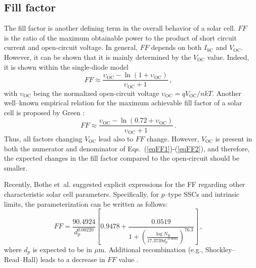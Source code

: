 \documentclass[a4paper,fleqn]{cas-sc}
\begin{document}
\subsection{Fill factor}
The fill factor is another defining term in the overall behavior of a solar cell.
$FF$ is the ratio of the maximum obtainable power to the product of short circuit current and open-circuit voltage.
In general, $FF$ depends on both $I_\mathrm{SC}$ and $V_\mathrm{OC}$. 
However, it can be shown that it is mainly determined by the $V_\mathrm{OC}$ value. 
Indeed, it is shown \cite{YangHandbookPVSi} within the single-diode model
\begin{equation}
\label{eqFF1}
    FF \approx \frac{\upsilon_\mathrm{OC}-\ln\left(1+\upsilon_\mathrm{OC}\right)}{\upsilon_\mathrm{OC}+1} \,,
\end{equation}
with $\upsilon_\mathrm{OC}$ being the normalized open-circuit voltage 
$\upsilon_\mathrm{OC}=qV_\mathrm{OC}/nkT$.
Another well--known empirical relation for the maximum achievable fill factor of a solar cell is proposed by Green \cite{Green1981,Green1982}:
\begin{equation}
\label{eqFF2}
    FF \approx \frac{\upsilon_\mathrm{OC}-\ln\left(0.72+\upsilon_\mathrm{OC}\right)}{\upsilon_\mathrm{OC}+1} \,.
\end{equation}
Thus, all factors changing $V_\mathrm{OC}$ lead also to $FF$ change.
However, $V_\mathrm{OC}$ is present in both the numerator and denominator of Eqs.~(\ref{eqFF1})-(\ref{eqFF2}), 
and therefore, the expected changes in the fill factor compared to the open-circuit should be smaller.

Recently, Bothe et~al. \cite{Bothe2023} suggested explicit expressions for the FF regarding other characteristic solar cell parameters.
Specifically, for $p$--type SSCs and intrinsic limits, the parameterization can be written as follows:
\begin{equation}
\label{eqFF3}
    FF = \frac{90.4924}{d_p^{0.00220}}\left[0.9478+\frac{0.0519}{1+\left(\frac{\log N_\mathrm{B}}{17.3739 d_p^{-0.0093}}\right)^{76.3}}\right] \,,
\end{equation}
where
$d_p$ is expected to be in $\mu$m.
Additional recombination (e.g., Shockley–Read–Hall) leads to a decrease in $FF$ value \cite{Bothe2023}.
\end{document}
